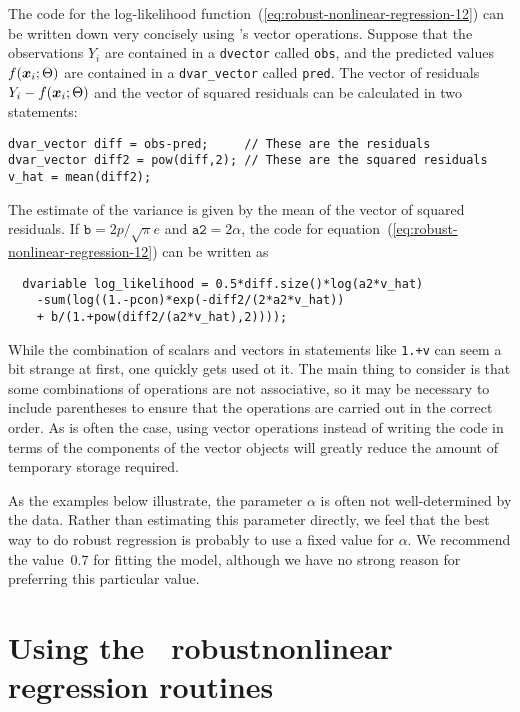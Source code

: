 \documentclass{admbmanual}
\begin{document}
The code for the log-likelihood function~(\ref{eq:robust-nonlinear-regression-12})  %
can be
written down very concisely using \scAD's vector operations. 
Suppose that the observations $Y_i$ are contained in a
\texttt{dvector} called \texttt{obs}, and the predicted values  $f({\mbox{\boldmath $x$}}_i;\Theta)$
are contained in a \texttt{dvar\_vector} called \texttt{pred}. The vector of
residuals $Y_i -f({\mbox{\boldmath $x$}}_i;\Theta)$ and the vector of
squared residuals can be calculated in two statements:
\begin{lstlisting}
dvar_vector diff = obs-pred;     // These are the residuals
dvar_vector diff2 = pow(diff,2); // These are the squared residuals
v_hat = mean(diff2);
\end{lstlisting}
The estimate of the variance is given by the mean
of the vector of squared residuals.  If $\texttt{b}=2p/\sqrt{\pi}e$
and $\texttt{a2}=2\alpha$, the code for equation~(\ref{eq:robust-nonlinear-regression-12}) %
can be
written as 
\begin{lstlisting}
  dvariable log_likelihood = 0.5*diff.size()*log(a2*v_hat)
    -sum(log((1.-pcon)*exp(-diff2/(2*a2*v_hat))
    + b/(1.+pow(diff2/(a2*v_hat),2))));
\end{lstlisting}

While the combination of scalars and vectors in statements 
like \texttt{1.+v} can seem a bit strange at first, one quickly 
gets used ot it. The main thing to consider is that 
some combinations of operations are not associative, so it
may be necessary to include parentheses to ensure that the 
operations are carried out in the correct order. 
As is often the case, using vector operations instead of
writing the code in terms of the components of the vector 
objects will greatly reduce the amount of temporary 
storage required.

As the examples below illustrate, the parameter $\alpha$ is often not
well-determined by the data. Rather than estimating this parameter
directly, we feel that the best way to do robust regression is
probably to use  a fixed value for $\alpha$.
We recommend the value~$0.7$ for fitting the model, although
we have no strong reason for preferring this particular value. 
 
 
\section{Using the \scAD\ robust\br nonlinear regression routines}
\label{sec:using-routines}
\end{document}
